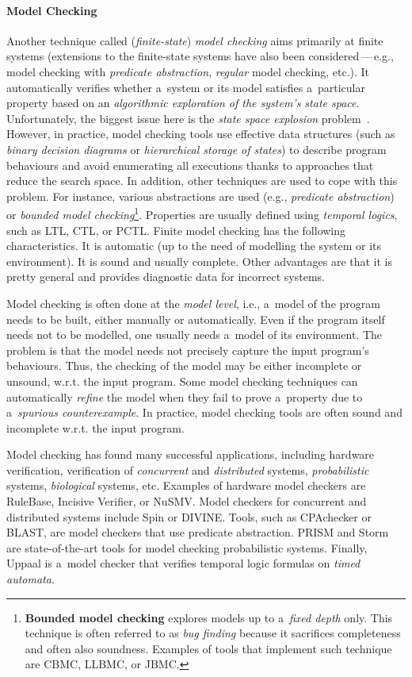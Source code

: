 \paragraph{Model Checking}
Another technique called (\emph{finite-state}) \emph{model checking} aims primarily at finite systems (extensions to the finite-state systems have also been considered\,---\,e.g., model checking with \emph{predicate abstraction}, \emph{regular} model checking, etc.). It automatically verifies  whether a~system or its model satisfies a~particular property based on an \emph{algorithmic exploration of the system's state space}. Unfortunately, the biggest issue here is the \emph{state space explosion} problem~\cite{stateExpl}. However, in practice, model checking tools use effective data structures (such as \emph{binary decision diagrams} or \emph{hierarchical storage of states}) to describe program behaviours and avoid enumerating all executions thanks to approaches that reduce the search space. In addition, other techniques are used to cope with this problem. For instance, various abstractions are used (e.g., \emph{predicate abstraction}) or \emph{bounded model checking}\footnote{\textbf{Bounded model checking} explores models up to a~\emph{fixed depth} only. This technique is often referred to as \emph{bug finding} because it sacrifices completeness and often also soundness. Examples of tools that implement such technique are CBMC, LLBMC, or JBMC.}. Properties are usually defined using \emph{temporal logics}, such as LTL, CTL, or PCTL. Finite model checking has the following characteristics. It is automatic (up to the need of modelling the system or its environment). It is sound and usually complete. Other advantages are that it is pretty general and provides diagnostic data for incorrect systems. 

Model checking is often done at the \emph{model level}, i.e., a~model of the program needs to be built, either manually or automatically. Even if the program itself needs not to be modelled, one usually needs a~model of its environment. The problem is that the model needs not precisely capture the input program's behaviours. Thus, the checking of the model may be either incomplete or unsound, w.r.t. the input program. Some model checking techniques can automatically \emph{refine} the model when they fail to prove a~property due to a~\emph{spurious counterexample}. In practice, model checking tools are often sound and incomplete w.r.t. the input program.

Model checking has found many successful applications, including hardware verification, verification of \emph{concurrent} and \emph{distributed} systems, \emph{probabilistic} systems, \emph{biological} systems, etc. Examples of hardware model checkers are RuleBase, Incisive Verifier, or NuSMV. Model checkers for concurrent and distributed systems include Spin or DIVINE. Tools, such as CPAchecker or BLAST, are model checkers that use predicate abstraction. PRISM and Storm are state-of-the-art tools for model checking probabilistic systems. Finally, Uppaal is a~model checker that verifies temporal logic formulas on \emph{timed automata}.

